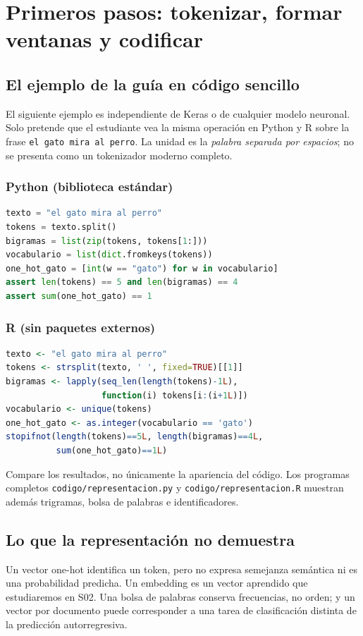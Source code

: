 \chapter{Primeros pasos: tokenizar, formar ventanas y codificar}
\section{El ejemplo de la guía en código sencillo}
El siguiente ejemplo es independiente de Keras o de cualquier modelo neuronal. Solo pretende que el estudiante vea la misma operación en Python y R sobre la frase \texttt{el gato mira al perro}. La unidad es la \emph{palabra separada por espacios}; no se presenta como un tokenizador moderno completo.
\subsection{Python (biblioteca estándar)}
\begin{lstlisting}[language=Python]
texto = "el gato mira al perro"
tokens = texto.split()
bigramas = list(zip(tokens, tokens[1:]))
vocabulario = list(dict.fromkeys(tokens))
one_hot_gato = [int(w == "gato") for w in vocabulario]
assert len(tokens) == 5 and len(bigramas) == 4
assert sum(one_hot_gato) == 1
\end{lstlisting}
\subsection{R (sin paquetes externos)}
\begin{lstlisting}[language=R]
texto <- "el gato mira al perro"
tokens <- strsplit(texto, ' ', fixed=TRUE)[[1]]
bigramas <- lapply(seq_len(length(tokens)-1L),
                   function(i) tokens[i:(i+1L)])
vocabulario <- unique(tokens)
one_hot_gato <- as.integer(vocabulario == 'gato')
stopifnot(length(tokens)==5L, length(bigramas)==4L,
          sum(one_hot_gato)==1L)
\end{lstlisting}
\noindent Compare los resultados, no únicamente la apariencia del código. Los programas completos \texttt{codigo/representacion.py} y \texttt{codigo/representacion.R} muestran además trigramas, bolsa de palabras e identificadores.
\section{Lo que la representación no demuestra}
Un vector one-hot identifica un token, pero no expresa semejanza semántica ni es una probabilidad predicha. Un embedding es un vector aprendido que estudiaremos en S02. Una bolsa de palabras conserva frecuencias, no orden; y un vector por documento puede corresponder a una tarea de clasificación distinta de la predicción autorregresiva.

